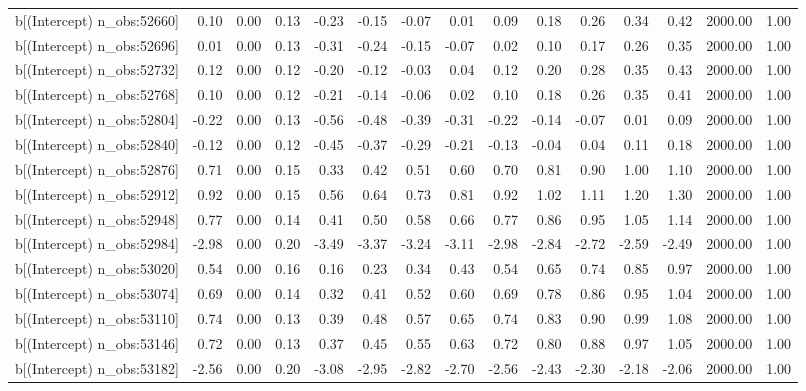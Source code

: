 \begin{table}[ht]
\begin{tabular}{rrrrrrrrrrrrrrr}
  b[(Intercept) n\_obs:52660] & 0.10 & 0.00 & 0.13 & -0.23 & -0.15 & -0.07 & 0.01 & 0.09 & 0.18 & 0.26 & 0.34 & 0.42 & 2000.00 & 1.00 \\ 
  b[(Intercept) n\_obs:52696] & 0.01 & 0.00 & 0.13 & -0.31 & -0.24 & -0.15 & -0.07 & 0.02 & 0.10 & 0.17 & 0.26 & 0.35 & 2000.00 & 1.00 \\ 
  b[(Intercept) n\_obs:52732] & 0.12 & 0.00 & 0.12 & -0.20 & -0.12 & -0.03 & 0.04 & 0.12 & 0.20 & 0.28 & 0.35 & 0.43 & 2000.00 & 1.00 \\ 
  b[(Intercept) n\_obs:52768] & 0.10 & 0.00 & 0.12 & -0.21 & -0.14 & -0.06 & 0.02 & 0.10 & 0.18 & 0.26 & 0.35 & 0.41 & 2000.00 & 1.00 \\ 
  b[(Intercept) n\_obs:52804] & -0.22 & 0.00 & 0.13 & -0.56 & -0.48 & -0.39 & -0.31 & -0.22 & -0.14 & -0.07 & 0.01 & 0.09 & 2000.00 & 1.00 \\ 
  b[(Intercept) n\_obs:52840] & -0.12 & 0.00 & 0.12 & -0.45 & -0.37 & -0.29 & -0.21 & -0.13 & -0.04 & 0.04 & 0.11 & 0.18 & 2000.00 & 1.00 \\ 
  b[(Intercept) n\_obs:52876] & 0.71 & 0.00 & 0.15 & 0.33 & 0.42 & 0.51 & 0.60 & 0.70 & 0.81 & 0.90 & 1.00 & 1.10 & 2000.00 & 1.00 \\ 
  b[(Intercept) n\_obs:52912] & 0.92 & 0.00 & 0.15 & 0.56 & 0.64 & 0.73 & 0.81 & 0.92 & 1.02 & 1.11 & 1.20 & 1.30 & 2000.00 & 1.00 \\ 
  b[(Intercept) n\_obs:52948] & 0.77 & 0.00 & 0.14 & 0.41 & 0.50 & 0.58 & 0.66 & 0.77 & 0.86 & 0.95 & 1.05 & 1.14 & 2000.00 & 1.00 \\ 
  b[(Intercept) n\_obs:52984] & -2.98 & 0.00 & 0.20 & -3.49 & -3.37 & -3.24 & -3.11 & -2.98 & -2.84 & -2.72 & -2.59 & -2.49 & 2000.00 & 1.00 \\ 
  b[(Intercept) n\_obs:53020] & 0.54 & 0.00 & 0.16 & 0.16 & 0.23 & 0.34 & 0.43 & 0.54 & 0.65 & 0.74 & 0.85 & 0.97 & 2000.00 & 1.00 \\ 
  b[(Intercept) n\_obs:53074] & 0.69 & 0.00 & 0.14 & 0.32 & 0.41 & 0.52 & 0.60 & 0.69 & 0.78 & 0.86 & 0.95 & 1.04 & 2000.00 & 1.00 \\ 
  b[(Intercept) n\_obs:53110] & 0.74 & 0.00 & 0.13 & 0.39 & 0.48 & 0.57 & 0.65 & 0.74 & 0.83 & 0.90 & 0.99 & 1.08 & 2000.00 & 1.00 \\ 
  b[(Intercept) n\_obs:53146] & 0.72 & 0.00 & 0.13 & 0.37 & 0.45 & 0.55 & 0.63 & 0.72 & 0.80 & 0.88 & 0.97 & 1.05 & 2000.00 & 1.00 \\ 
  b[(Intercept) n\_obs:53182] & -2.56 & 0.00 & 0.20 & -3.08 & -2.95 & -2.82 & -2.70 & -2.56 & -2.43 & -2.30 & -2.18 & -2.06 & 2000.00 & 1.00 \\ 

\end{tabular}
\end{table}
